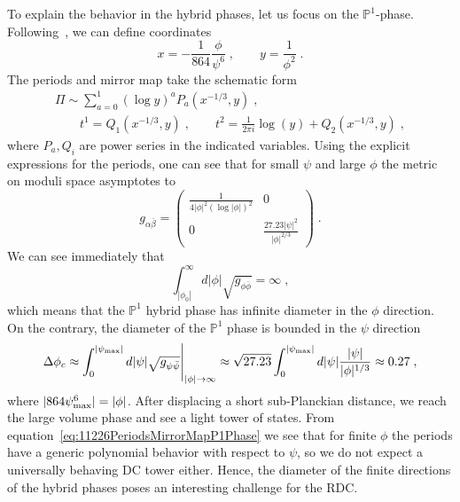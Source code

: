 \documentclass[11pt,a4paper]{article}
\numberwithin{equation}{section}
\numberwithin{table}{section}\setlength{\multlinegap}{25pt}
\begin{document}
To explain the behavior in the hybrid phases, let us focus on the $\mathbb{P}^1$-phase. Following~\cite{Klemm:1995tj}, we can define coordinates
\begin{equation}
    \label{eq:11226SWCoordinates}
    x=-\frac{1}{864}\frac{\phi}{\psi^{6}}\;,\qquad y=\frac{1}{\phi^2}\;.
\end{equation}
The periods and mirror map take the schematic form
\begin{equation}
    \label{eq:11226PeriodsMirrorMapP1Phase}
    \begin{gathered}
        \Pi\sim\sum_{a=0}^{1}(\log y)^a P_a\left(x^{-1/3},y\right)\;,\\
        \qquad t^1=Q_1\left(x^{-1/3},y\right)\;,\qquad t^2=\frac{1}{2\pi i}\log(y)+Q_2\left(x^{-1/3},y\right)\;,
    \end{gathered}
\end{equation}
where $P_a,Q_i$ are power series in the indicated variables. Using the explicit expressions for the periods, one can see that for small $\psi$ and large $\phi$ the metric on moduli space asymptotes to
\begin{equation}
    \label{eq:11226MetricP1Phase}
    g_{\alpha\bar{\beta}}=
    \begin{pmatrix}
        \frac{1}{4|\phi|^2(\log|\phi|)^2} & 0\\
        0 & \frac{27.23|\psi|^2}{|\phi|^{2/3}}
    \end{pmatrix}\;.
\end{equation}
We can see immediately that
\begin{equation}
    \label{eq:11226InfiniteDistance}
    \int_{|\phi_0|}^{\infty}d|\phi|\sqrt{g_{\phi\bar{\phi}}}=\infty\;,
\end{equation}
which means that the $\mathbb{P}^1$ hybrid phase has infinite diameter in the $\phi$ direction. On the contrary, the diameter of the $\mathbb{P}^1$ phase is bounded in the $\psi$ direction
\begin{equation}
    \label{eq:11226FiniteDistanceApprox}
    \Delta\phi_c\approx\int_{0}^{|\psi_\textup{max}|}d|\psi|\sqrt{g_{\psi\bar{\psi}}}\Bigg|_{|\phi|\to\infty}
    \approx\sqrt{27.23}\int_{0}^{|\psi_\textup{max}|}d|\psi|\frac{|\psi|}{|\phi|^{1/3}}\approx 0.27\;,
\end{equation}
where $|864\psi_\textup{max}^6|=|\phi|$. After displacing a short sub-Planckian distance, we reach the large volume phase and see a light tower of states. From equation~\eqref{eq:11226PeriodsMirrorMapP1Phase} we see that for finite $\phi$ the periods have a generic polynomial behavior with respect to $\psi$, so we do not expect a universally behaving DC tower either. Hence, the diameter of the finite directions of the hybrid phases poses an interesting challenge for the RDC.
\end{document}
